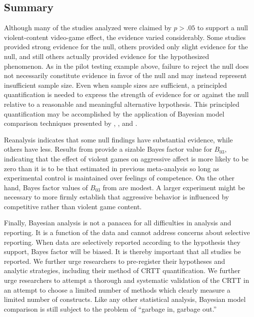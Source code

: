 \documentclass[man]{apa6}
\begin{document}
\subsection{Summary}
Although many of the studies analyzed were claimed by $p>.05$ to support a null violent-content video-game effect, the evidence varied considerably.  Some studies provided strong evidence for the null, others provided only slight evidence for the null, and still others actually provided evidence for 
the hypothesized phenomenon. As in the pilot testing example above, failure to reject the null does not necessarily constitute evidence in favor of the null and may instead represent insufficient sample size. Even when sample sizes are sufficient, a principled quantification is needed to express the strength of evidence for or against the null relative to a reasonable and meaningful alternative hypothesis. This principled quantification may be accomplished by the application of Bayesian model comparison techniques presented by \citet{Rouder:Morey:2012}, \citet{Rouder:etal:2012}, and \citet{Dienes:2011, Dienes:2014}. 

Reanalysis indicates that some null findings have substantial evidence, while others have less. Results from \citet{Przybylski:etal:2014} provide a sizable Bayes factor value for $B_{03}$, indicating that the effect of violent games on aggressive affect is more likely to be zero than it is to be that estimated in previous meta-analysis so long as experimental control is maintained over feelings of competence. On the other hand, Bayes factor values of $B_{03}$ from \citet{Adachi:Willoughby:2011} are modest.  A larger experiment might be necessary to more firmly establish that aggressive behavior is influenced by competitive rather than violent game content.

Finally, Bayesian analysis is not a panacea for all difficulties in analysis and reporting.  It is a function of the data and cannot address concerns about selective reporting.  When data are selectively reported according to the hypothesis they support, Bayes factor will be biased. It is thereby important that all studies be reported. We further urge researchers to pre-register their hypotheses and analytic strategies, including their method of CRTT quantification. We further urge researchers to attempt a thorough and systematic validation of the CRTT in an attempt to choose a limited number of methods which clearly measure a limited number of constructs. Like any other statistical analysis, Bayesian model comparison is still subject to the problem of ``garbage in, garbage out.''
\end{document}
